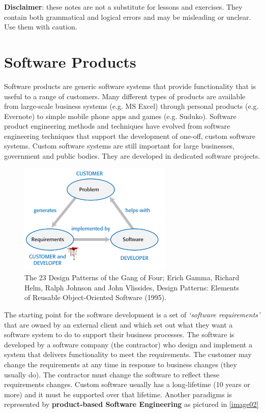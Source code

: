 \documentclass[10pt,a4paper]{report}
\begin{document}
	\clearpage
	
	\textbf{Disclaimer}: these notes are not a substitute for lessons and exercises. They contain both grammatical and logical errors and may be misleading or unclear.\\
	Use them with caution.
	
	\newpage %

\tableofcontents


\chapter{Software Products}
 Software products are generic software systems that provide functionality
that is useful to a range of customers. Many different types of products are available from large-scale business systems (e.g. MS Excel) through personal products (e.g. Evernote) to
simple mobile phone apps and games (e.g. Suduko). Software product engineering methods and techniques have evolved from software engineering techniques that support the development of
one-off, custom software systems. Custom software systems are still important for large businesses, government and public bodies. They are developed in dedicated software
projects.
\begin{figure}[h]
	\centering
	\includegraphics[width=0.65\textwidth]{image01}
	\caption{The 23 Design Patterns of the Gang of Four; Erich Gamma, Richard Helm, Ralph Johnson and John Vlissides, Design Patterns: Elements of Reusable Object-Oriented Software (1995).}
	\label{image01}
\end{figure}
The starting point for the software development is a set of \textit{‘software
	requirements’} that are owned by an external client and which set out what they want a software system to do to support their business processes.
The software is developed by a software company (the contractor) who design and implement a system that delivers functionality to meet the requirements. The customer may change the requirements at any time in response to business changes (they usually do). The contractor must change the software to reflect these requirements changes. Custom software usually has a long-lifetime (10 years or more) and it must be supported over that lifetime.
Another paradigms is represented by \textbf{product-based Software Engineering} as pictured in \ref{image02}
\end{document}
